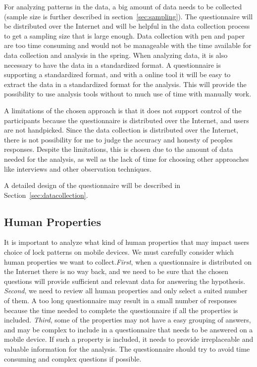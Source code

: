   For analyzing patterns in the data, a big amount of data needs to be collected (sample size is further described in section~\ref{sec:sampling}). The questionnaire will be distributed over the Internet and will be helpful in the data collection process to get a sampling size that is large enough. Data collection with pen and paper are too time consuming and would not be manageable with the time available for data collection and analysis in the spring. When analyzing data, it is also necessary to have the data in a standardized format. A questionnaire is supporting a standardized format, and with a online tool it will be easy to extract the data in a standardized format for the analysis. This will provide the possibility to use analysis tools without to much use of time with manually work.

  A limitations of the chosen approach is that it does not support control of the participants because the questionnaire is distributed over the Internet, and users are not handpicked. Since the data collection is distributed over the Internet, there is not possibility for me to judge the accuracy and honesty of peoples responses. Despite the limitations, this is chosen due to the amount of data needed for the analysis, as well as the lack of time for choosing other approaches like interviews and other observation techniques. 

  A detailed design of the questionnaire will be described in Section~\ref{sec:datacollection}.

  \subsection{Human Properties} \label{sec:datarequirements}
  
  It is important to analyze what kind of human properties that may impact users choice of lock patterns on mobile devices. We must carefully consider which human properties we want to collect.{\it First}, when a questionnaire is distributed on the Internet there is no way back, and we need to be sure that the chosen questions will provide sufficient and relevant data for answering the hypothesis. {\it Second}, we need to review all human properties and only select a suited number of them. A too long questionnaire may result in a small number of responses because the time needed to complete the questionnaire if all the properties is included. {\it Third}, some of the properties may not have a easy grouping of answers, and may be complex to include in a questionnaire that needs to be answered on a mobile device. If such a property is included, it needs to provide irreplaceable and valuable information for the analysis. The questionnaire should try to avoid time consuming and complex questions if possible. 

